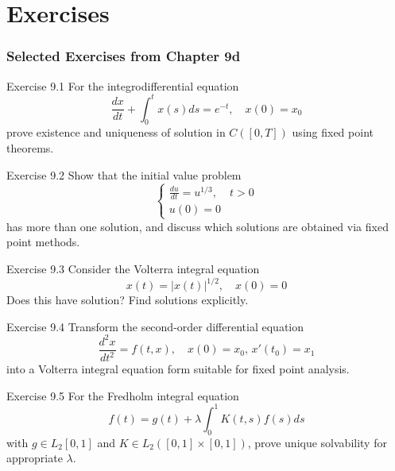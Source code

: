\documentclass[aspectratio=169,10pt]{beamer}
\begin{document}
\section{Exercises}

\begin{frame}[allowframebreaks]
    \frametitle{Selected Exercises from Chapter 9d}

    \begin{block}{Exercise 9.1}
        For the integrodifferential equation
        \[
        \frac{dx}{dt} + \int_0^t x(s)ds = e^{-t}, \quad x(0) = x_0
        \]
        prove existence and uniqueness of solution in $C([0,T])$ using fixed point theorems.
    \end{block}

    \begin{block}{Exercise 9.2}
        Show that the initial value problem
        \[
        \begin{cases}
            \frac{du}{dt} = u^{1/3}, & t > 0 \\
            u(0) = 0
        \end{cases}
        \]
        has more than one solution, and discuss which solutions are obtained via fixed point methods.
    \end{block}

    \framebreak

    \begin{block}{Exercise 9.3}
        Consider the Volterra integral equation
        \[
        x(t) = |x(t)|^{1/2}, \quad x(0) = 0
        \]
        Does this have solution? Find solutions explicitly.
    \end{block}

    \begin{block}{Exercise 9.4}
        Transform the second-order differential equation
        \[
        \frac{d^2x}{dt^2} = f(t,x), \quad x(0) = x_0, \, x'(t_0) = x_1
        \]
        into a Volterra integral equation form suitable for fixed point analysis.
    \end{block}

    \framebreak

    \begin{block}{Exercise 9.5}
        For the Fredholm integral equation
        \[
        f(t) = g(t) + \lambda \int_0^1 K(t,s)f(s)ds
        \]
        with $g \in L_2[0,1]$ and $K \in L_2([0,1] \times [0,1])$, prove unique solvability for appropriate $\lambda$.
    \end{block}


\end{frame}
\end{document}
